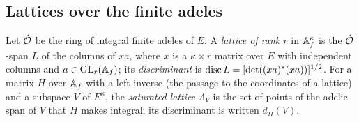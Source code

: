 \subsection{Lattices over the finite adeles}\label{ss:lattices}
Let $\hat{\mathcal{O}}$ be the ring of integral finite adeles of $E$. A \emph{lattice of rank $r$} in $\mathbb{A}_f^\kappa$ is the $\hat{\mathcal{O}}$-span $L$ of the columns of $xa$, where $x$ is a $\kappa\times r$ matrix over $E$ with
independent columns and $a\in\operatorname{GL}_r(\mathbb{A}_f)$; its \emph{discriminant} is $\operatorname{disc} L=[\det((xa)^*(xa))]^{1/2}$. For a matrix $H$ over $\mathbb{A}_f$ with a left inverse (the passage to the coordinates of a lattice) and
a subspace $V$ of $E^\kappa$, the \emph{saturated lattice} $\Lambda_V$ is the set of points of the adelic span of $V$ that $H$ makes integral; its discriminant is written $d_H(V)$.

